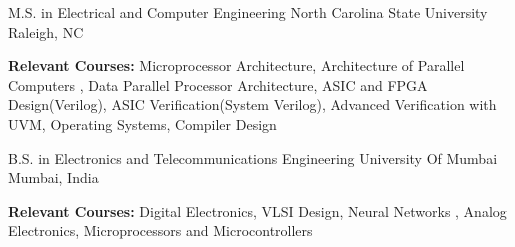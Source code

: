 \par\addvspace{1ex}


\begin{cventries}

  \cventry
    {M.S. in Electrical and Computer Engineering} %
    {North Carolina State University} %
    {Raleigh, NC} %
    {\color{darkgray}{Aug. 2017 - Expected May. 2019}} %
    {
      \begin{cvitems} %
        \item \textbf{Relevant Courses:} {Microprocessor Architecture, Architecture of Parallel Computers , Data Parallel Processor Architecture, ASIC and FPGA Design(Verilog), ASIC Verification(System Verilog), Advanced Verification with UVM, Operating Systems, Compiler Design}
      \end{cvitems}
    }

    \cventry
    {B.S. in Electronics and Telecommunications Engineering} %
    {University Of Mumbai} %
    {Mumbai, India} %
    {\color{darkgray}{Aug. 2013 - May.2017}} %
    {
      \begin{cvitems} %
        \item \textbf{Relevant Courses:} {Digital Electronics, VLSI Design, Neural Networks , Analog Electronics, Microprocessors and Microcontrollers }
      \end{cvitems}
    }

\end{cventries}
